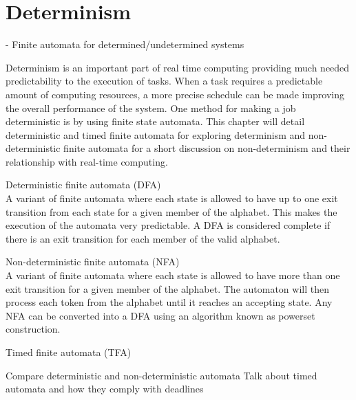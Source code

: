 \section{Determinism} \label{sc:determinism}

- Finite automata for determined/undetermined systems

Determinism is an important part of real time computing providing much needed predictability to the execution of tasks. When a task requires a predictable amount of computing resources, a more precise schedule can be made improving the overall performance of the system. One method for making a job deterministic is by using finite state automata. This chapter will detail deterministic and timed finite automata for exploring determinism and non-deterministic finite automata for a short discussion on non-determinism and their relationship with real-time computing. \par

Deterministic finite automata (DFA)\\
A variant of finite automata where each state is allowed to have up to one exit transition from each state for a given member of the alphabet. This makes the execution of the automata very predictable. A DFA is considered complete if there is an exit transition for each member of the valid alphabet. \par

Non-deterministic finite automata (NFA)\\
A variant of finite automata where each state is allowed to have more than one exit transition for a given member of the alphabet. The automaton will then process each token from the alphabet until it reaches an accepting state. Any NFA can be converted into a DFA using an algorithm known as powerset construction. \par

Timed finite automata (TFA)

Compare deterministic and non-deterministic automata
Talk about timed automata and how they comply with deadlines

